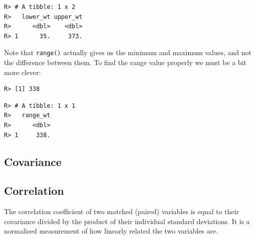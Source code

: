 \documentclass[english,10pt,a4paper,oneside]{book}
\newenvironment{Shaded}{\begin{snugshade}}{\end{snugshade}}
\newcommand{\KeywordTok}[1]{\textcolor[rgb]{0.13,0.29,0.53}{\textbf{#1}}}
\newcommand{\DataTypeTok}[1]{\textcolor[rgb]{0.13,0.29,0.53}{#1}}
\newcommand{\DecValTok}[1]{\textcolor[rgb]{0.00,0.00,0.81}{#1}}
\newcommand{\StringTok}[1]{\textcolor[rgb]{0.31,0.60,0.02}{#1}}
\newcommand{\OperatorTok}[1]{\textcolor[rgb]{0.81,0.36,0.00}{\textbf{#1}}}
\newcommand{\NormalTok}[1]{#1}
\theoremstyle{definition}
\theoremstyle{definition}
\theoremstyle{definition}
\theoremstyle{remark}
\begin{document}
\begin{verbatim}
R> # A tibble: 1 x 2
R>   lower_wt upper_wt
R>      <dbl>    <dbl>
R> 1      35.     373.
\end{verbatim}

Note that \texttt{range()} actually gives us the minimum and maximum
values, and not the difference between them. To find the range value
properly we must be a bit more clever:

\begin{Shaded}
\end{Shaded}

\begin{verbatim}
R> [1] 338
\end{verbatim}

\begin{Shaded}
\end{Shaded}

\begin{verbatim}
R> # A tibble: 1 x 1
R>   range_wt
R>      <dbl>
R> 1     338.
\end{verbatim}

\subsection{Covariance}\label{covariance}

\subsection{Correlation}\label{correlation}

The correlation coefficient of two matched (paired) variables is equal
to their covariance divided by the product of their individual standard
deviations. It is a normalised measurement of how linearly related the
two variables are.
\end{document}
